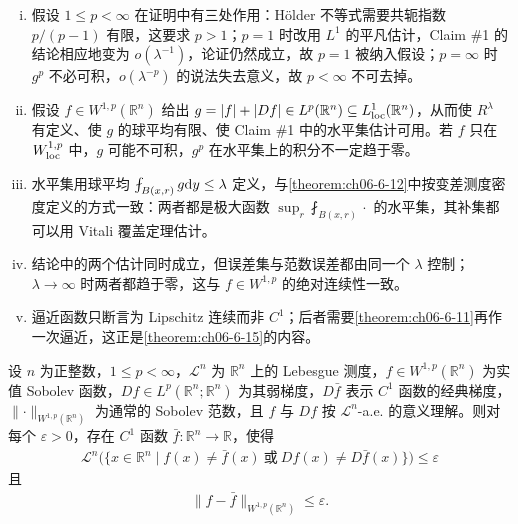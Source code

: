 \documentclass[../../main.tex]{subfiles}%
\begin{document}
\begin{remark}\label{remark:ch06-thm-6-14-条件}
\begin{enumerate}[(i)]
\item 假设 $1\le p<\infty$ 在证明中有三处作用：Hölder 不等式需要共轭指数 $p/(p-1)$ 有限，这要求 $p>1$；$p=1$ 时改用 $L^1$ 的平凡估计，Claim \#1 的结论相应地变为 $o(\lambda^{-1})$，论证仍然成立，故 $p=1$ 被纳入假设；$p=\infty$ 时 $g^p$ 不必可积，$o(\lambda^{-p})$ 的说法失去意义，故 $p<\infty$ 不可去掉。
\item 假设 $f\in W^{1,p}(\mathbb{R}^n)$ 给出 $g=\lvert f\rvert+\lvert Df\rvert\in L^p(\mathbb{R}^n)\subseteq L^1_{\mathrm{loc}}(\mathbb{R}^n)$，从而使 $R^\lambda$ 有定义、使 $g$ 的球平均有限、使 Claim \#1 中的水平集估计可用。若 $f$ 只在 $W^{1,p}_{\mathrm{loc}}$ 中，$g$ 可能不可积，$g^p$ 在水平集上的积分不一定趋于零。
\item 水平集用球平均 $\fint_{B(x,r)}g\diff y\le\lambda$ 定义，与\cref{theorem:ch06-6-12}中按变差测度密度定义的方式一致：两者都是极大函数 $\sup_r\fint_{B(x,r)}\cdot$ 的水平集，其补集都可以用 Vitali 覆盖定理估计。%
\item 结论中的两个估计同时成立，但误差集与范数误差都由同一个 $\lambda$ 控制；$\lambda\to\infty$ 时两者都趋于零，这与 $f\in W^{1,p}$ 的绝对连续性一致。
\item 逼近函数只断言为 Lipschitz 连续而非 $C^1$；后者需要\cref{theorem:ch06-6-11}再作一次逼近，这正是\cref{theorem:ch06-6-15}的内容。%
\end{enumerate}
\end{remark}

\begin{theorem}\label{theorem:ch06-6-15}
设 $n$ 为正整数，$1\le p<\infty$，$\mathcal{L}^n$ 为 $\mathbb{R}^n$ 上的 Lebesgue 测度，$f\in W^{1,p}(\mathbb{R}^n)$ 为实值 Sobolev 函数，$Df\in L^p(\mathbb{R}^n;\mathbb{R}^n)$ 为其弱梯度，$D\bar f$ 表示 $C^1$ 函数的经典梯度，$\lVert\cdot\rVert_{W^{1,p}(\mathbb{R}^n)}$ 为通常的 Sobolev 范数，且 $f$ 与 $Df$ 按 $\mathcal{L}^n$-a.e. 的意义理解。则对每个 $\varepsilon>0$，存在 $C^1$ 函数 $\bar f:\mathbb{R}^n\to\mathbb{R}$，使得
\begin{align*}
\mathcal{L}^n\bigl(\{x\in\mathbb{R}^n\mid f(x)\ne\bar f(x)\ \text{或}\ Df(x)\ne D\bar f(x)\}\bigr)\le\varepsilon
\end{align*}
且
\begin{align*}
\lVert f-\bar f\rVert_{W^{1,p}(\mathbb{R}^n)}\le\varepsilon .
\end{align*}
\end{theorem}
\end{document}
